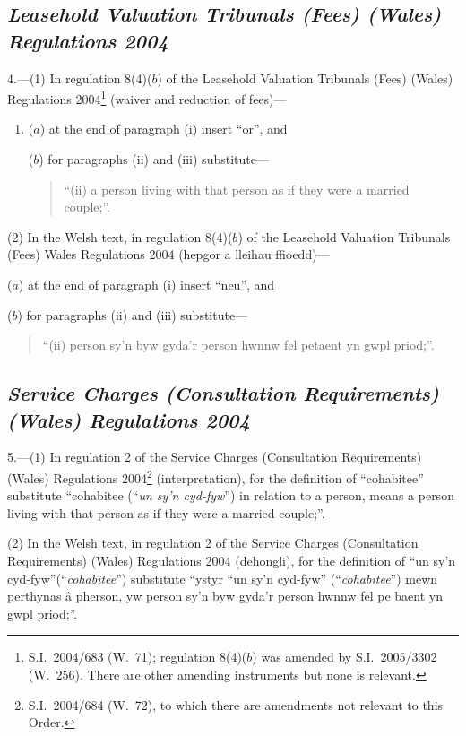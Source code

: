 \documentclass[12pt,a4paper]{article}
\begin{document}
\subsection*{\itshape Leasehold Valuation Tribunals (Fees) (Wales) Regulations 2004}

4.—(1) In regulation 8(4)($b$)  of the Leasehold Valuation Tribunals (Fees) (Wales) Regulations 2004\footnote{S.I.~2004/683 (W.~71); regulation 8(4)($b$)  was amended by S.I.~2005/3302 (W.~256). There are other amending instruments but none is relevant.} (waiver and reduction of fees)—
\begin{enumerate}\item[]
($a$) at the end of paragraph (i)  insert “or”, and

($b$) for paragraphs (ii)  and (iii)  substitute—
\begin{quotation}
“(ii) a person living with that person as if they were a married couple;”.
\end{quotation}
\end{enumerate}

(2) In the Welsh text, in regulation 8(4)($b$)  of the Leasehold Valuation Tribunals (Fees) Wales Regulations 2004 (\foreignlanguage{welsh}{hepgor a lleihau ffioedd})—

($a$) at the end of paragraph (i)  insert “neu”, and

($b$) for paragraphs (ii)  and (iii)  substitute—
\begin{quotation}
\foreignlanguage{welsh}{“(ii) person sy’n byw gyda’r person hwnnw fel petaent yn gwpl priod;”.}
\end{quotation}

\subsection*{\itshape Service Charges (Consultation Requirements) (Wales) Regulations 2004}

5.—(1) In regulation 2 of the Service Charges (Consultation Requirements) (Wales) Regulations 2004\footnote{S.I.~2004/684 (W.~72), to which there are amendments not relevant to this Order.} (interpretation), for the definition of “cohabitee” substitute “cohabitee (“\emph{un sy’n cyd-fyw}”) in relation to a person, means a person living with that person as if they were a married couple;”.

(2) In the Welsh text, in regulation 2 of the Service Charges (Consultation Requirements) (Wales) Regulations 2004 (dehongli), for the definition of “un sy’n cyd-fyw”(“\emph{cohabitee}”) substitute “\foreignlanguage{welsh}{ystyr “un sy’n cyd-fyw” (“\emph{cohabitee}”) mewn perthynas â pherson, yw person sy’n byw gyda’r person hwnnw fel pe baent yn gwpl priod;}”.
\end{document}
